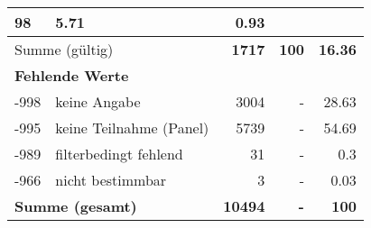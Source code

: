 \begin{longtable}{lXrrr}
       \num{98} &
       \num[round-mode=places,round-precision=2]{5.71} &
         \num[round-mode=places,round-precision=2]{0.93} \\
     \midrule
     \multicolumn{2}{l}{Summe (gültig)} &
       \textbf{\num{1717}} &
     \textbf{\num{100}} &
       \textbf{\num[round-mode=places,round-precision=2]{16.36}} \\
     \multicolumn{5}{l}{\textbf{Fehlende Werte}}\\
       -998 &
       keine Angabe &
         \num{3004} &
        - &
         \num[round-mode=places,round-precision=2]{28.63} \\
       -995 &
       keine Teilnahme (Panel) &
         \num{5739} &
        - &
         \num[round-mode=places,round-precision=2]{54.69} \\
       -989 &
       filterbedingt fehlend &
         \num{31} &
        - &
         \num[round-mode=places,round-precision=2]{0.3} \\
       -966 &
       nicht bestimmbar &
         \num{3} &
        - &
         \num[round-mode=places,round-precision=2]{0.03} \\
     \midrule
     \multicolumn{2}{l}{\textbf{Summe (gesamt)}} &
          \textbf{\num{10494}} &
        \textbf{-} &
        \textbf{\num{100}} \\
     \bottomrule
     \end{longtable}
     
